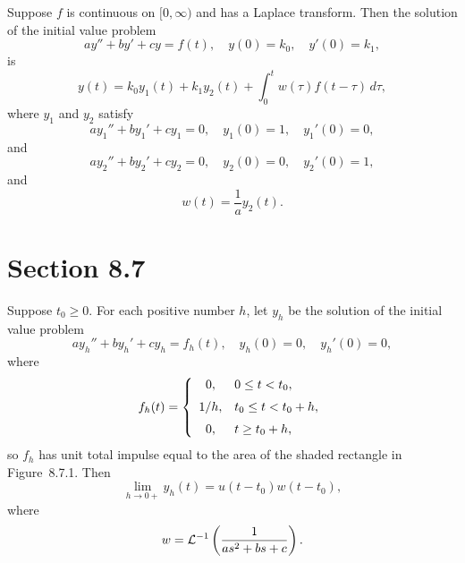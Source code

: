 \setcounter{theorem}{2}
\setcounter{equation}{12}
\begin{theorem}
  \label{thmtype:8.6.3} Suppose $f$ is continuous on $[0,\infty)$ and has a Laplace transform. Then
  the solution of the initial value problem
  \begin{equation}
    \label{eq:8.6.13}ay''+by'+cy=f(t),\quad y(0)=k_{0},\quad y'(0)=k_{1},
  \end{equation}
  is
  \begin{equation}
    \label{eq:8.6.14}y(t)=k_{0}y_{1}(t)+k_{1}y_{2}(t)+\int_{0}^{t}w(\tau)f(t-\tau)\,d\tau,
  \end{equation}
  where $y_{1}$ and $y_{2}$ satisfy
  \begin{equation}
    \label{eq:8.6.15}ay_{1}''+by_{1}'+cy_{1}=0,\quad y_{1}(0)=1,\quad y_{1}'(0)=0,
  \end{equation}
  and
  \begin{equation}
    \label{eq:8.6.16}ay_{2}''+by_{2}'+cy_{2}=0,\quad y_{2}(0)=0,\quad y_{2}'(0)=1,
  \end{equation}
  and
  \begin{equation}
    \label{eq:8.6.17}w(t)=\frac{1}{a}y_{2}(t).
  \end{equation}
\end{theorem}

\section*{Section 8.7}
\setcounter{chapter}{8}
\setcounter{section}{7}

\setcounter{theorem}{0}
\setcounter{equation}{0}
\begin{theorem}
  \label{thmtype:8.7.1} Suppose $t_{0}\ge0$. For each positive number $h$, let $y_{h}$ be the
  solution of the initial value problem
  \begin{equation}
    \label{eq:8.7.1}ay_{h}''+by_{h}'+cy_{h}=f_{h}(t),\quad y_{h}(0)=0,\quad y_{h}'(0)=0,
  \end{equation}
  where
  \begin{equation}
    \label{eq:8.7.2}f_{h}(t)=\left\{
    \begin{array}{cl}
      0,   & 0\le t<t_{0},       \\[2\jot]
      1/h, & t_{0}\le t<t_{0}+h, \\[2\jot]
      0,   & t\ge t_{0}+h,
    \end{array}\right.
  \end{equation}
  so $f_{h}$ has unit total impulse equal to the area of the shaded rectangle in
  Figure~8.7.1. Then
  \begin{equation}
    \label{eq:8.7.3}\lim_{h\to0+}y_{h}(t)=u(t-t_{0})w(t-t_{0}),
  \end{equation}
  where
  \[
    w={\cal L}^{-1}\left(\frac{1}{as^{2}+bs+c}\right).
  \]
\end{theorem}


